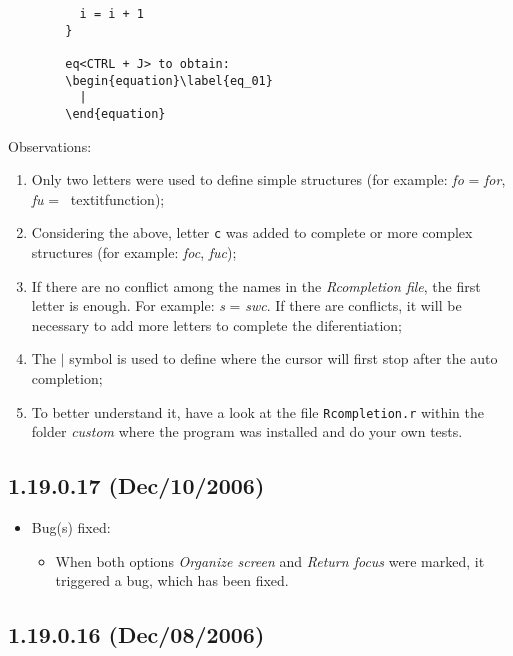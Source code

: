 \begin{itemize}
\begin{footnotesize}
\begin{verbatim}
          i = i + 1
        }

        eq<CTRL + J> to obtain:
        \begin{equation}\label{eq_01}
          |
        \end{equation}
      \end{verbatim}
    \end{footnotesize}

    Observations:

    \begin{enumerate}
      \item Only two letters were used to define simple structures
        (for example: \textit{fo} = \textit{for}, \textit{fu} = \
        textit{function});
      \item Considering the above, letter \texttt{c} was added
        to complete or more complex structures (for example:
        \textit{foc}, \textit{fuc});
      \item If there are no conflict among the names in the
        \textit{Rcompletion file}, the first letter is enough. For
        example: \textit{s} = \textit{swc}. If there are conflicts, it
        will be necessary to add more letters to complete the diferentiation;
      \item The \texttt{$|$} symbol is used to define where the cursor
        will first stop after the auto completion;
      \item To better understand it, have a look at the file
        \texttt{Rcompletion.r} within the folder \textit{custom}
        where the program was installed and do your own tests.
    \end{enumerate}
\end{itemize}


\subsection{1.19.0.17 (Dec/10/2006)}

\begin{itemize}
  \item Bug(s) fixed:
    \begin{itemize}
      \item When both options \textit{Organize screen} and
        \textit{Return focus} were marked, it triggered a bug,
        which has been fixed.
    \end{itemize}
\end{itemize}


\subsection{1.19.0.16 (Dec/08/2006)}


